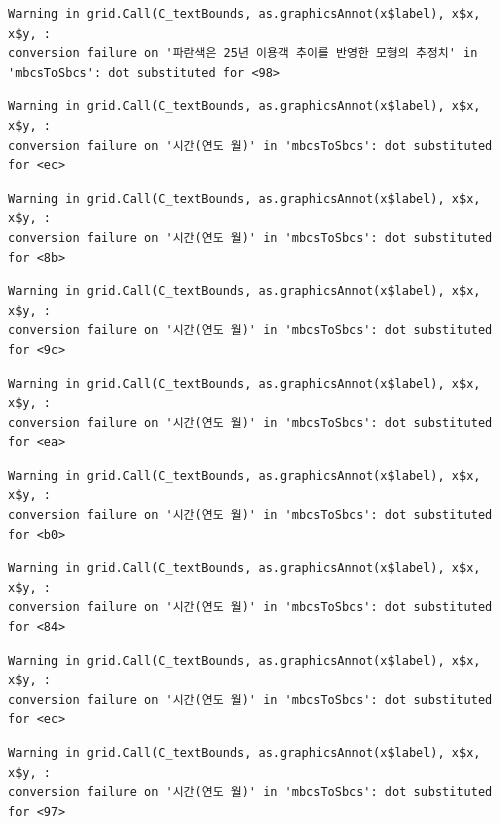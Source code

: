 \documentclass[
  letterpaper,
  DIV=11,
  numbers=noendperiod]{scrreprt}
\begin{document}
\begin{verbatim}
Warning in grid.Call(C_textBounds, as.graphicsAnnot(x$label), x$x, x$y, :
conversion failure on '파란색은 25년 이용객 추이를 반영한 모형의 추정치' in
'mbcsToSbcs': dot substituted for <98>
\end{verbatim}

\begin{verbatim}
Warning in grid.Call(C_textBounds, as.graphicsAnnot(x$label), x$x, x$y, :
conversion failure on '시간(연도 월)' in 'mbcsToSbcs': dot substituted for <ec>
\end{verbatim}

\begin{verbatim}
Warning in grid.Call(C_textBounds, as.graphicsAnnot(x$label), x$x, x$y, :
conversion failure on '시간(연도 월)' in 'mbcsToSbcs': dot substituted for <8b>
\end{verbatim}

\begin{verbatim}
Warning in grid.Call(C_textBounds, as.graphicsAnnot(x$label), x$x, x$y, :
conversion failure on '시간(연도 월)' in 'mbcsToSbcs': dot substituted for <9c>
\end{verbatim}

\begin{verbatim}
Warning in grid.Call(C_textBounds, as.graphicsAnnot(x$label), x$x, x$y, :
conversion failure on '시간(연도 월)' in 'mbcsToSbcs': dot substituted for <ea>
\end{verbatim}

\begin{verbatim}
Warning in grid.Call(C_textBounds, as.graphicsAnnot(x$label), x$x, x$y, :
conversion failure on '시간(연도 월)' in 'mbcsToSbcs': dot substituted for <b0>
\end{verbatim}

\begin{verbatim}
Warning in grid.Call(C_textBounds, as.graphicsAnnot(x$label), x$x, x$y, :
conversion failure on '시간(연도 월)' in 'mbcsToSbcs': dot substituted for <84>
\end{verbatim}

\begin{verbatim}
Warning in grid.Call(C_textBounds, as.graphicsAnnot(x$label), x$x, x$y, :
conversion failure on '시간(연도 월)' in 'mbcsToSbcs': dot substituted for <ec>
\end{verbatim}

\begin{verbatim}
Warning in grid.Call(C_textBounds, as.graphicsAnnot(x$label), x$x, x$y, :
conversion failure on '시간(연도 월)' in 'mbcsToSbcs': dot substituted for <97>
\end{verbatim}
\end{document}
